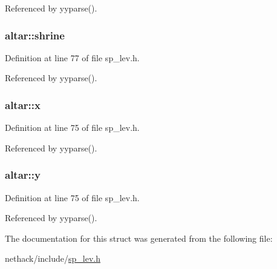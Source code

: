 Referenced by yyparse().

\hypertarget{structaltar_a307b482c89f08c22966a37f2c88a0dbb}{
\subsubsection[{shrine}]{ altar\+::shrine}}\label{structaltar_a307b482c89f08c22966a37f2c88a0dbb}


Definition at line 77 of file sp\+\_\+lev.\+h.



Referenced by yyparse().

\hypertarget{structaltar_ab6398c7a80fc9af8b6b8a4276af9e916}{
\subsubsection[{x}]{ altar\+::x}}\label{structaltar_ab6398c7a80fc9af8b6b8a4276af9e916}


Definition at line 75 of file sp\+\_\+lev.\+h.



Referenced by yyparse().

\hypertarget{structaltar_a156ee63e1d9839d71f3407c83a03f872}{
\subsubsection[{y}]{ altar\+::y}}\label{structaltar_a156ee63e1d9839d71f3407c83a03f872}


Definition at line 75 of file sp\+\_\+lev.\+h.



Referenced by yyparse().



The documentation for this struct was generated from the following file\+:\begin{DoxyCompactItemize}
\item 
nethack/include/\hyperlink{sp__lev_8h}{sp\+\_\+lev.\+h}\end{DoxyCompactItemize}
